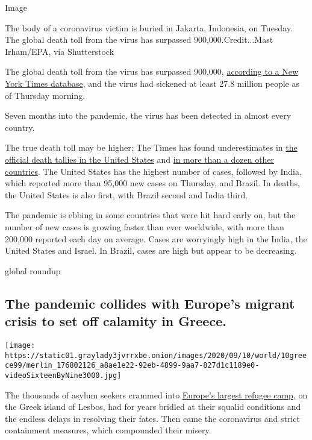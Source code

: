 Image

The body of a coronavirus victim is buried in Jakarta, Indonesia, on
Tuesday. The global death toll from the virus has surpassed
900,000.Credit...Mast Irham/EPA, via Shutterstock

The global death toll from the virus has surpassed 900,000,
\href{https://www.nytimes3xbfgragh.onion/interactive/2020/world/coronavirus-maps.html}{according
to a New York Times database}, and the virus had sickened at least 27.8
million people as of Thursday morning.

Seven months into the pandemic, the virus has been detected in almost
every country.

The true death toll may be higher; The Times has found underestimates in
\href{https://www.nytimes3xbfgragh.onion/interactive/2020/04/28/us/coronavirus-death-toll-total.html}{the
official death tallies in the United States} and
\href{https://www.nytimes3xbfgragh.onion/interactive/2020/04/21/world/coronavirus-missing-deaths.html}{in
more than a dozen other countries}. The United States has the highest
number of cases, followed by India, which reported more than 95,000 new
cases on Thursday, and Brazil. In deaths, the United States is also
first, with Brazil second and India third.

The pandemic is ebbing in some countries that were hit hard early on,
but the number of new cases is growing faster than ever worldwide, with
more than 200,000 reported each day on average. Cases are worryingly
high in the India, the United States and Israel. In Brazil, cases are
high but appear to be decreasing.

global roundup

\hypertarget{the-pandemic-collides-with-europes-migrant-crisis-to-set-off-calamity-in-greece}{%
\subsection{The pandemic collides with Europe's migrant crisis to set
off calamity in
Greece.}\label{the-pandemic-collides-with-europes-migrant-crisis-to-set-off-calamity-in-greece}}

\texttt{[image: https://static01.graylady3jvrrxbe.onion/images/2020/09/10/world/10greece99/merlin\_176802126\_a8ae1e22-92eb-4899-9aa7-827d1c1189e0-videoSixteenByNine3000.jpg]}

The thousands of asylum seekers crammed into
\href{https://www.nytimes3xbfgragh.onion/2018/10/02/world/europe/greece-lesbos-moria-refugees.html}{Europe's
largest refugee camp}, on the Greek island of Lesbos, had for years
bridled at their squalid conditions and the endless delays in resolving
their fates. Then came the coronavirus and strict containment measures,
which compounded their misery.

